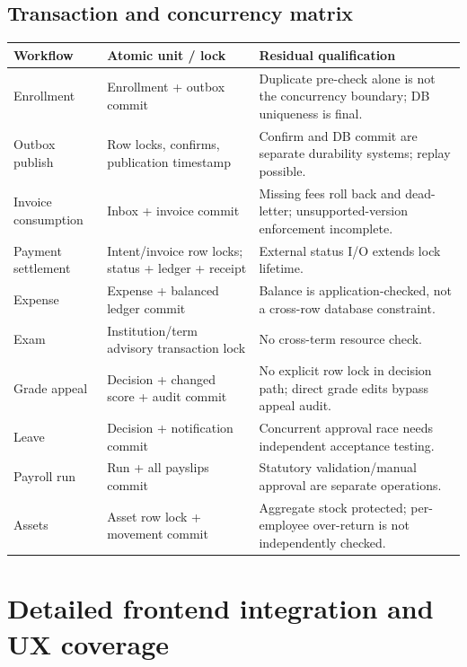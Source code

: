 \documentclass[10pt,a4paper]{article}
\begin{document}
\subsection{Transaction and concurrency matrix}
\begin{tabularx}{\textwidth}{@{}L{35mm}Y Y@{}}
\toprule Workflow & Atomic unit / lock & Residual qualification\\\midrule
Enrollment & Enrollment + outbox commit & Duplicate pre-check alone is not the concurrency boundary; DB uniqueness is final.\\
Outbox publish & Row locks, confirms, publication timestamp & Confirm and DB commit are separate durability systems; replay possible.\\
Invoice consumption & Inbox + invoice commit & Missing fees roll back and dead-letter; unsupported-version enforcement incomplete.\\
Payment settlement & Intent/invoice row locks; status + ledger + receipt & External status I/O extends lock lifetime.\\
Expense & Expense + balanced ledger commit & Balance is application-checked, not a cross-row database constraint.\\
Exam & Institution/term advisory transaction lock & No cross-term resource check.\\
Grade appeal & Decision + changed score + audit commit & No explicit row lock in decision path; direct grade edits bypass appeal audit.\\
Leave & Decision + notification commit & Concurrent approval race needs independent acceptance testing.\\
Payroll run & Run + all payslips commit & Statutory validation/manual approval are separate operations.\\
Assets & Asset row lock + movement commit & Aggregate stock protected; per-employee over-return is not independently checked.\\
\bottomrule
\end{tabularx}

\clearpage
\section{Detailed frontend integration and UX coverage}\label{app:frontend}
\end{document}
